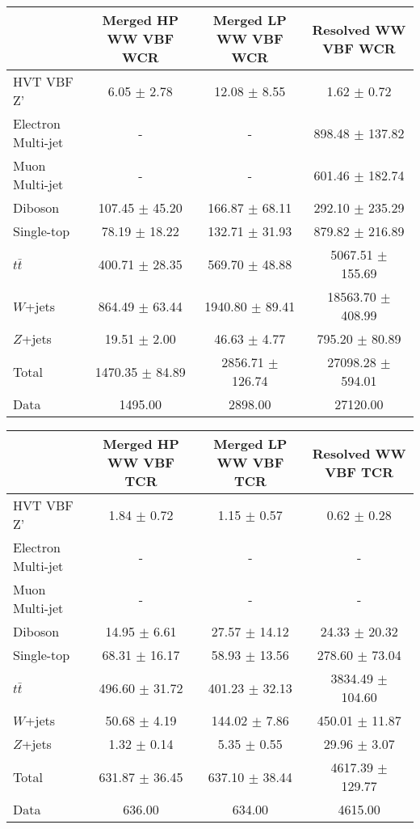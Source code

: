 
\begin{tabular}{|l|c|c|c|}
\hline
	  &	Merged HP WW VBF WCR &	Merged LP WW VBF WCR &	Resolved WW VBF WCR \\\hline 
	HVT VBF Z' &	6.05 $\pm$ 2.78 &	12.08 $\pm$ 8.55 &	1.62 $\pm$ 0.72 \\\hline 
	Electron Multi-jet &	- &	- &	898.48 $\pm$ 137.82 \\\hline 
	Muon Multi-jet &	- &	- &	601.46 $\pm$ 182.74 \\\hline 
	Diboson &	107.45 $\pm$ 45.20 &	166.87 $\pm$ 68.11 &	292.10 $\pm$ 235.29 \\\hline 
	Single-top &	78.19 $\pm$ 18.22 &	132.71 $\pm$ 31.93 &	879.82 $\pm$ 216.89 \\\hline 
	$t\bar{t}$ &	400.71 $\pm$ 28.35 &	569.70 $\pm$ 48.88 &	5067.51 $\pm$ 155.69 \\\hline 
	$W$+jets &	864.49 $\pm$ 63.44 &	1940.80 $\pm$ 89.41 &	18563.70 $\pm$ 408.99 \\\hline 
	$Z$+jets &	19.51 $\pm$ 2.00 &	46.63 $\pm$ 4.77 &	795.20 $\pm$ 80.89 \\\hline 
	Total &	1470.35 $\pm$ 84.89 &	2856.71 $\pm$ 126.74 &	27098.28 $\pm$ 594.01 \\\hline 
	Data &	1495.00 &	2898.00 &	27120.00 \\\hline 
\end{tabular}

\begin{tabular}{|l|c|c|c|}
\hline
	  &	Merged HP WW VBF TCR &	Merged LP WW VBF TCR &	Resolved WW VBF TCR \\\hline 
	HVT VBF Z' &	1.84 $\pm$ 0.72 &	1.15 $\pm$ 0.57 &	0.62 $\pm$ 0.28 \\\hline 
	Electron Multi-jet &	- &	- &	- \\\hline 
	Muon Multi-jet &	- &	- &	- \\\hline 
	Diboson &	14.95 $\pm$ 6.61 &	27.57 $\pm$ 14.12 &	24.33 $\pm$ 20.32 \\\hline 
	Single-top &	68.31 $\pm$ 16.17 &	58.93 $\pm$ 13.56 &	278.60 $\pm$ 73.04 \\\hline 
	$t\bar{t}$ &	496.60 $\pm$ 31.72 &	401.23 $\pm$ 32.13 &	3834.49 $\pm$ 104.60 \\\hline 
	$W$+jets &	50.68 $\pm$ 4.19 &	144.02 $\pm$ 7.86 &	450.01 $\pm$ 11.87 \\\hline 
	$Z$+jets &	1.32 $\pm$ 0.14 &	5.35 $\pm$ 0.55 &	29.96 $\pm$ 3.07 \\\hline 
	Total &	631.87 $\pm$ 36.45 &	637.10 $\pm$ 38.44 &	4617.39 $\pm$ 129.77 \\\hline 
	Data &	636.00 &	634.00 &	4615.00 \\\hline 
\end{tabular}

